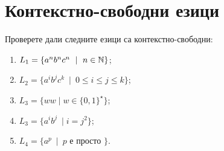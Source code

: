 \section{Контекстно-свободни езици}

\begin{problem}
  Проверете дали следните езици са контекстно-свободни:
  \begin{enumerate}
  \item
    $L_1 = \{a^nb^nc^n\ \mid\ n\in\N\}$;
  \item
    $L_2 = \{a^ib^jc^k\ \mid\ 0 \leq i \leq j \leq k\}$;
  \item
    $L_3 = \{ww\mid w\in \{0,1\}^\star\}$;
  \item
    $L_3 = \{a^ib^j\ \mid i = j^2\}$;
  \item
    $L_4 = \{a^p\ \mid\ p\mbox{ е просто }\}$.
  \end{enumerate}
\end{problem}

